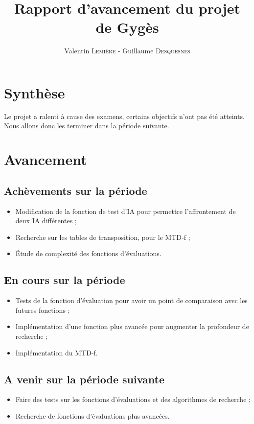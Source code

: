 \documentclass[a4paper]{article}
\title{Rapport d'avancement \no 2 du projet de Gygès}
\author{Valentin \textsc{Lemière} - Guillaume \textsc{Desquesnes}}
\date{}
\begin{document}
\maketitle

\section*{Synthèse}
	Le projet a ralenti à cause des examens, certains objectifs n'ont pas été atteints.
	Nous allons donc les terminer dans la période suivante.

\section*{Avancement}
	\subsection*{Achèvements sur la période}
		\begin{itemize}
			\item Modification de la fonction de test d'IA pour permettre l'affrontement de deux IA différentes ;
			\item Recherche sur les tables de transposition, pour le MTD-f ;
			\item \'Etude de complexité des fonctions d'évaluations.
		\end{itemize}


	\subsection*{En cours sur la période}
		\begin{itemize}
			\item Tests de la fonction d'évaluation pour avoir un point de comparaison
				avec les futures fonctions ;
			\item Implémentation d'une fonction plus avancée pour augmenter la profondeur de recherche ;
			\item Implémentation du MTD-f.
		\end{itemize}

	\subsection*{A venir sur la période suivante}
		\begin{itemize}
			\item Faire des tests sur les fonctions d'évaluations et des algorithmes de recherche ;
			\item Recherche de fonctions d'évaluations plus avancées.
		\end{itemize}
\end{document}
